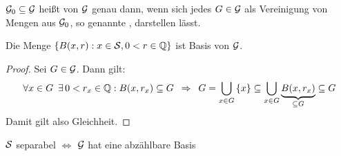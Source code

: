 \begin{definition} %
	$\G_0 \subseteq \G$ heißt  von $\G$ genau dann, wenn sich jedes $G \in \G$ als Vereinigung von Mengen aus $\G_0$,
	so genannte , darstellen lässt.
\end{definition}
%
\begin{beispiel}\label{bsp: 2.8} %
	Die Menge $\menge{ B(x,r) : x \in \S, 0 < r \in \Q}$ ist Basis von $\G$.
\end{beispiel}
\begin{proof}
	Sei $G \in \G$. Dann gilt:
	\begin{equation*}
		\forall x \in G \enskip \exists \,  0 < r_x \in \Q : B(x,r_x) \subseteq G 
		\follows
		G = \bigcup_{x\in G} \menge{x}
		\subseteq \bigcup_{x \in G} \underbrace{B(x,r_x)}_{\subseteq G} \subseteq G 
	\end{equation*}
	Damit gilt also Gleichheit.
\end{proof}


\begin{satz} \label{satz: 2.9}
	$\S$ separabel $\Leftrightarrow$ $\G$ hat eine abzählbare Basis
\end{satz}

